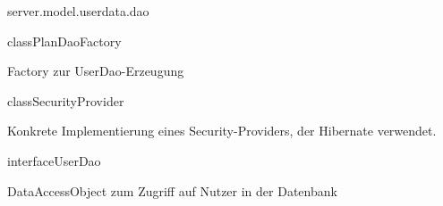 \begin{texdocpackage}{server.model.userdata.dao}
\begin{texdocclass}{class}{PlanDaoFactory}
\label{texdoclet:edu.kit.informatik.studyplan.server.model.userdata.dao.PlanDaoFactory}
\begin{texdocclassintro}
Factory zur UserDao-Erzeugung\end{texdocclassintro}
\begin{texdocclassconstructors}
\end{texdocclassconstructors}
\begin{texdocclassmethods}
\end{texdocclassmethods}
\end{texdocclass}


\begin{texdocclass}{class}{SecurityProvider}
\label{texdoclet:edu.kit.informatik.studyplan.server.model.userdata.dao.SecurityProvider}
\begin{texdocclassintro}
Konkrete Implementierung eines Security-Providers, der Hibernate verwendet.\end{texdocclassintro}
\begin{texdocclassconstructors}
\end{texdocclassconstructors}
\begin{texdocclassmethods}
\end{texdocclassmethods}
\end{texdocclass}


\begin{texdocclass}{interface}{UserDao}
\label{texdoclet:edu.kit.informatik.studyplan.server.model.userdata.dao.UserDao}
\begin{texdocclassintro}
DataAccessObject zum Zugriff auf Nutzer in der Datenbank\end{texdocclassintro}
\begin{texdocclassmethods}
\end{texdocclassmethods}
\end{texdocclass}
\end{texdocpackage}
